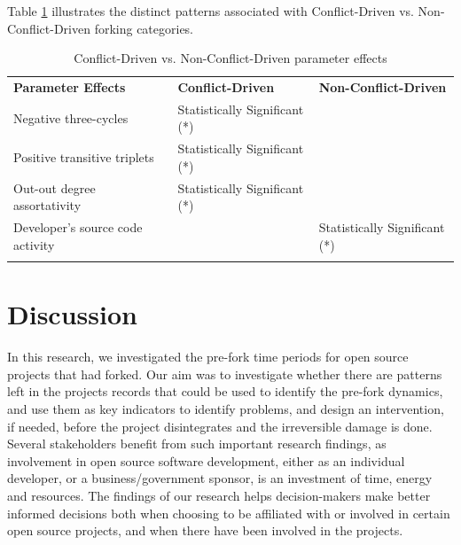 \documentclass[12pt,letterpaper]{gthesis2}  %
\begin{document}
\doublespacing

Table \ref{summaryConflictVsNonConflict} illustrates the distinct patterns associated with Conflict-Driven vs. Non-Conflict-Driven forking categories. 


\begin{table}[!htbp]
\caption{Conflict-Driven vs. Non-Conflict-Driven parameter effects}
\label{summaryConflictVsNonConflict} 
\begin{tabular}{l l l}
\hline\noalign{\smallskip}
\textbf{Parameter Effects} & \textbf{Conflict-Driven} & \textbf{Non-Conflict-Driven}\\
\noalign{\smallskip}\hline\noalign{\smallskip}
Negative three-cycles & {\footnotesize Statistically Significant (*)} &  \\ \hline
Positive transitive triplets & {\footnotesize Statistically Significant (*)}  & \\ \hline
Out-out degree assortativity & {\footnotesize Statistically Significant (*)} & \\ \hline
Developer’s source code activity &  & {\footnotesize Statistically Significant (*)} \\
\noalign{\smallskip}\hline
\end{tabular}
\end{table}



\pagebreak
\section{Discussion}
\label{Discussion}

In this research, we investigated the pre-fork time periods for open source projects that had forked. Our aim was to investigate whether there are patterns left in the projects records that could be used to identify the pre-fork dynamics, and use them as key indicators to identify problems, and design an intervention, if needed, before the project disintegrates and the irreversible damage is done. \\

Several stakeholders benefit from such important research findings, as involvement in open source software development, either as an individual developer, or a business/government sponsor, is an investment of time, energy and resources. The findings of our research helps decision-makers make better informed decisions both when choosing to be affiliated with or involved in certain open source projects, and when there have been involved in the projects.\\
\end{document}
